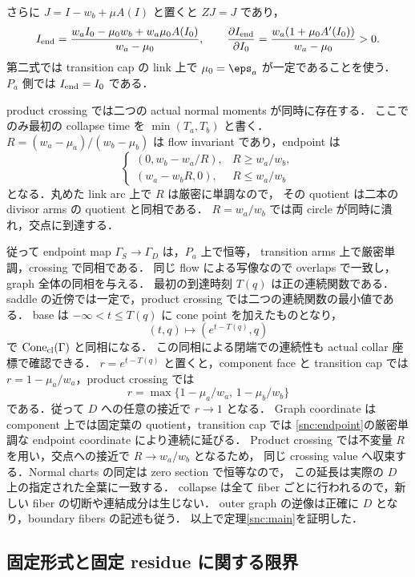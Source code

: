 さらに $J=I-w_b+\mu A(I)$ と置くと $ZJ=J$ であり，
\begin{equation}\label{snc:endpoint}
 I_{\rm end}
 =\frac{w_aI_0-\mu_0w_b+w_a\mu_0A(I_0)}{w_a-\mu_0},\qquad
 \frac{\partial I_{\rm end}}{\partial I_0}
 =\frac{w_a(1+\mu_0A'(I_0))}{w_a-\mu_0}>0.
\end{equation}
第二式では transition cap の link 上で $\mu_0=\eps_a$ が一定であることを使う．
$P_a$ 側では $I_{\rm end}=I_0$ である．

product crossing では二つの actual normal moments が同時に存在する．
ここでのみ最初の collapse time を $\min(T_a,T_b)$ と書く．
$R=(w_a-\mu_a)/(w_b-\mu_b)$ は flow invariant であり，endpoint は
\[
 \begin{cases}
 (0,w_b-w_a/R),&R\geq w_a/w_b,\\
 (w_a-w_bR,0),&R\leq w_a/w_b
 \end{cases}
\]
となる．丸めた link arc 上で $R$ は厳密に単調なので，
その quotient は二本の divisor arms の quotient と同相である．
$R=w_a/w_b$ では両 circle が同時に潰れ，交点に到達する．

従って endpoint map $\Gamma_S\to\Gamma_D$ は，$P_a$ 上で恒等，
transition arms 上で厳密単調，crossing で同相である．
同じ flow による写像なので overlaps で一致し，graph 全体の同相を与える．
最初の到達時刻 $T(q)$ は正の連続関数である．
saddle の近傍では一定で，product crossing では二つの連続関数の最小値である．
base は $-\infty<t\leq T(q)$ に cone point を加えたものとなり，
\[
 (t,q)\longmapsto(e^{t-T(q)},q)
\]
で $\operatorname{Cone}_{\rm cl}(\Gamma)$ と同相になる．
この同相による閉端での連続性も actual collar 座標で確認できる．
$r=e^{t-T(q)}$ と置くと，component face と transition cap では
$r=1-\mu_a/w_a$，product crossing では
\[
 r=\max\{1-\mu_a/w_a,\,1-\mu_b/w_b\}
\]
である．従って $D$ への任意の接近で $r\to1$ となる．
Graph coordinate は component 上では固定葉の quotient，transition cap では
\eqref{snc:endpoint}の厳密単調な endpoint coordinate により連続に延びる．
Product crossing では不変量 $R$ を用い，交点への接近で $R\to w_a/w_b$ となるため，
同じ crossing value へ収束する．Normal charts の同定は zero section で恒等なので，
この延長は実際の $D$ 上の指定された全葉に一致する．
collapse は全て fiber ごとに行われるので，新しい fiber の切断や連結成分は生じない．
outer graph の逆像は正確に $D$ となり，boundary fibers の記述も従う．
以上で定理\ref{snc:main}を証明した．

\subsection{固定形式と固定 residue に関する限界}

